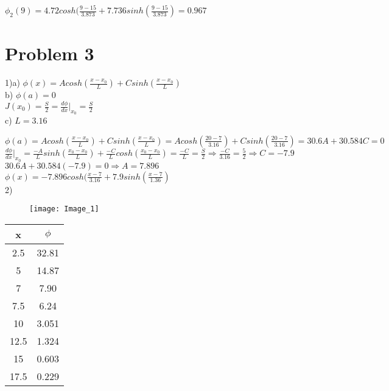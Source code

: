 \documentclass[12pt,fleqn, parskip=full]{scrartcl}
\begin{document}
$\phi_2(9) = 4.72cosh(\frac{9-15}{3.873}+7.736sinh(\frac{9-15}{3.873}) = 0.967$\\


\section{Problem 3}
1)a) $\phi(x) = Acosh(\frac{x-x_0}{L})+Csinh(\frac{x-x_0}{L})$\\

b) $\phi(a) = 0$\\

$J(x_0) = \frac{S}{2} = \frac{d\phi}{dx}|_{x_0} = \frac{S}{2}$\\

c) $L = 3.16$

$\phi(a) = Acosh(\frac{x-x_0}{L})+Csinh(\frac{x-x_0}{L}) = Acosh(\frac{20-7}{3.16})+Csinh(\frac{20-7}{3.16}) = 30.6A + 30.584C = 0$\\

$\frac{d\phi}{dx}|_{x_0} = \frac{-A}{L}sinh(\frac{x_0-x_0}{L})+\frac{-C}{L}cosh(\frac{x_0-x_0}{L}) = \frac{-C}{L} = \frac{S}{2} \Rightarrow \frac{-C}{3.16} = \frac{5}{2} \Rightarrow C = -7.9$\\

$30.6A + 30.584(-7.9) = 0 \Rightarrow A = 7.896$\\

$\phi(x) = -7.896cosh(\frac{x-7}{3.16} +7.9sinh(\frac{x-7}{1.36})$\\
 2) 
 
\begin{figure}[H]
	\centering
	\texttt{[image: Image\_1]}
\end{figure}

\begin{tabular}{|c|c|}
\hline
x & $\phi$ \\
\hline
2.5 & 32.81\\
\hline
5 & 14.87\\
\hline
7 & 7.90\\
\hline
7.5 & 6.24\\
\hline
10 & 3.051\\
\hline
12.5 & 1.324\\
\hline
15 & 0.603\\
\hline
17.5 & 0.229\\
\hline

\end{tabular}
\end{document}
